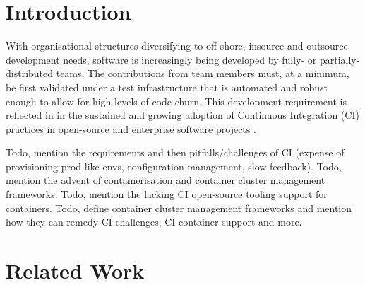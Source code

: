 \documentclass{report}
\begin{document}
\section{Introduction}
With organisational structures diversifying to off-shore, insource and outsource
development needs, software is increasingly being developed by fully- or 
partially-distributed teams. The contributions from team members must, at a minimum, be first validated
under a test infrastructure that is automated and robust enough to allow for
high levels of code churn. This development requirement is reflected in 
in the sustained and growing adoption of Continuous Integration (CI) practices in open-source and enterprise software projects \citep{Duvall, Fitz, Vas}. 
\par
Todo, mention the requirements and then pitfalls/challenges of CI (expense of provisioning prod-like envs, configuration management, slow feedback). Todo, mention the advent of containerisation and container cluster management frameworks. Todo, mention the lacking CI open-source tooling support for containers. Todo, define container cluster management frameworks and mention how they can remedy CI challenges, CI container support and more. 

\section{Related Work}
\lipsum[1] 
\end{document}
